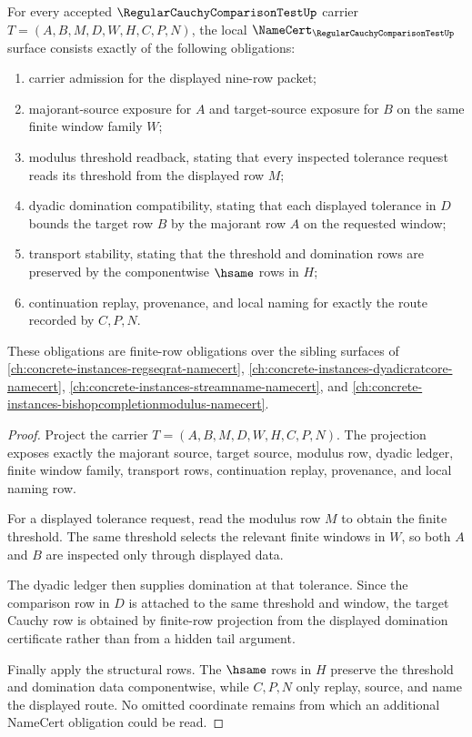 \begin{theorem}
\label{thm:regular-cauchy-comparison-test-namecert-obligations}
For every accepted $\RegularCauchyComparisonTestUp$ carrier $T=(A,B,M,D,W,H,C,P,N)$, the local $\NameCert_{\RegularCauchyComparisonTestUp}$ surface consists exactly of the following obligations:
\begin{enumerate}
\item carrier admission for the displayed nine-row packet;
\item majorant-source exposure for $A$ and target-source exposure for $B$ on the same finite window family $W$;
\item modulus threshold readback, stating that every inspected tolerance request reads its threshold from the displayed row $M$;
\item dyadic domination compatibility, stating that each displayed tolerance in $D$ bounds the target row $B$ by the majorant row $A$ on the requested window;
\item transport stability, stating that the threshold and domination rows are preserved by the componentwise $\hsame$ rows in $H$;
\item continuation replay, provenance, and local naming for exactly the route recorded by $C,P,N$.
\end{enumerate}
These obligations are finite-row obligations over the sibling surfaces of \autoref{ch:concrete-instances-regseqrat-namecert}, \autoref{ch:concrete-instances-dyadicratcore-namecert}, \autoref{ch:concrete-instances-streamname-namecert}, and \autoref{ch:concrete-instances-bishopcompletionmodulus-namecert}.
\end{theorem}
\begin{proof}
Project the carrier $T=(A,B,M,D,W,H,C,P,N)$. The projection exposes exactly the majorant source, target source, modulus row, dyadic ledger, finite window family, transport rows, continuation replay, provenance, and local naming row.

For a displayed tolerance request, read the modulus row $M$ to obtain the finite threshold. The same threshold selects the relevant finite windows in $W$, so both $A$ and $B$ are inspected only through displayed data.

The dyadic ledger then supplies domination at that tolerance. Since the comparison row in $D$ is attached to the same threshold and window, the target Cauchy row is obtained by finite-row projection from the displayed domination certificate rather than from a hidden tail argument.

Finally apply the structural rows. The $\hsame$ rows in $H$ preserve the threshold and domination data componentwise, while $C,P,N$ only replay, source, and name the displayed route. No omitted coordinate remains from which an additional NameCert obligation could be read.
\end{proof}

